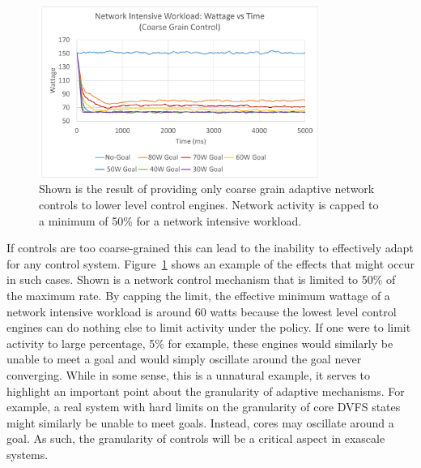             \begin{figure}[htb!]
                \centering
                \includegraphics[width=0.82\textwidth]{Fig/network_coarse.pdf}
                \caption[Network Intensive Workload Using an Adaptive Goal Adjustment Policy with Coarse-grain Control (Watts vs Time)]{Shown is the result of providing only coarse grain adaptive network controls to lower level control engines. Network activity is capped to a minimum of 50\% for a network intensive workload.}
                \label{fig:network_coarse}
            \end{figure}

            If controls are too coarse-grained this can lead to the inability to effectively adapt for any control system. Figure~\ref{fig:network_coarse} shows an example of the effects that might occur in such cases. Shown is a network control mechanism that is limited to 50\% of the maximum rate. By capping the limit, the effective minimum wattage of a network intensive workload is around 60 watts because the lowest level control engines can do nothing else to limit activity under the policy. If one were to limit activity to large percentage, 5\% for example, these engines would similarly be unable to meet a goal and would simply oscillate around the goal never converging. While in some sense, this is a unnatural example, it serves to highlight an important point about the granularity of adaptive mechanisms. For example, a real system with hard limits on the granularity of core DVFS states might similarly be unable to meet goals. Instead, cores may oscillate around a goal. As such, the granularity of controls will be a critical aspect in exascale systems.

